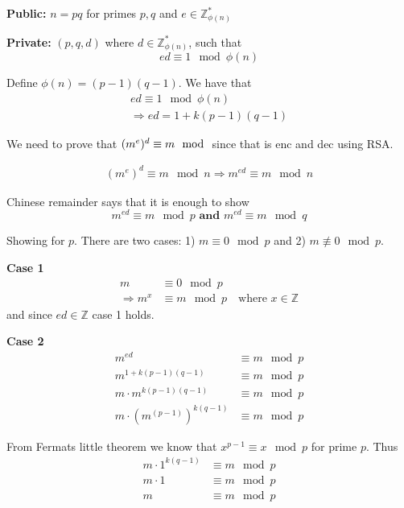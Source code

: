 
\textbf{Public:} $n = pq$ for primes $p, q$ and $e \in \mathbb{Z}_{\phi(n)}^*$

\textbf{Private:} $(p, q, d)$ where $d \in \mathbb{Z}_{\phi(n)}^*$, such that
\[ ed \equiv 1 \mod \phi(n) \]

Define $\phi(n) = (p-1)(q-1)$. We have that
\begin{align*}
  ed \equiv 1 \mod \phi(n)\\
  \Rightarrow ed = 1 + k(p - 1)(q - 1)
\end{align*}

We need to prove that $(m^e)^d \equiv m \mod$ since that is enc and dec using RSA.


\begin{align*}
(m^e)^d \equiv m \mod n
\Rightarrow m^{ed} \equiv m \mod n
\end{align*}

Chinese remainder says that it is enough to show
\[ m^{ed} \equiv m \mod p \textbf{ and } m^{ed} \equiv m \mod q \]

Showing for $p$. There are two cases: 1) $m \equiv 0 \mod p$ and 2) $m \not\equiv 0 \mod p$.

\textbf{Case 1}
\begin{align*}
m &\equiv 0 \mod p\\
\Rightarrow m^x &\equiv m \mod p \quad \text{where } x \in \mathbb{Z}
\end{align*}
and since $ed \in \mathbb{Z}$ case 1 holds.

\textbf{Case 2}
\begin{align*}
m^{ed} &\equiv m \mod p\\
m^{1 + k(p-1)(q-1)} &\equiv m \mod p\\
m \cdot m^{k(p-1)(q-1)} &\equiv m \mod p\\
m \cdot (m^{(p-1)})^{k(q-1)} &\equiv m \mod p
\end{align*}

From Fermats little theorem we know that $x^{p-1} \equiv x \mod p$ for prime $p$. Thus
\begin{align*}
m \cdot 1^{k(q-1)} &\equiv m \mod p\\
m \cdot 1 &\equiv m \mod p\\
m &\equiv m \mod p
\end{align*}
